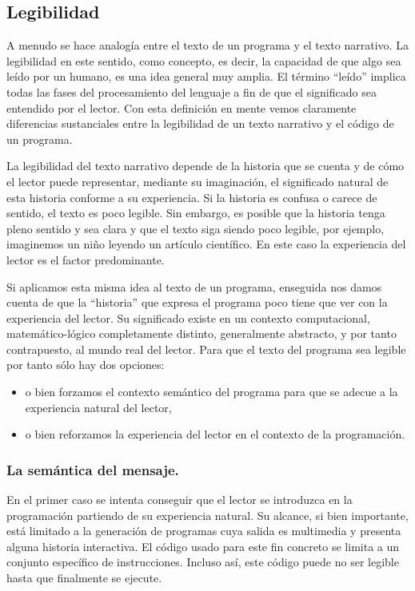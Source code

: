 \documentclass{llncs}
\begin{document}
\subsection{Legibilidad}
\label{subsec:readability}
A menudo se hace analogía entre el texto de un programa y el texto narrativo. La legibilidad en este sentido, como concepto, es decir, la capacidad de que algo sea leído por un humano, es una idea general muy amplia. El término ``leído'' implica todas las fases del procesamiento del lenguaje a fin de que el significado sea entendido por el lector. Con esta definición en mente vemos claramente diferencias sustanciales entre la legibilidad de un texto narrativo y el código de un programa. 

La legibilidad del texto narrativo depende de la historia que se cuenta y de cómo el lector puede representar, mediante su imaginación, el significado natural de esta historia conforme a su experiencia. Si la historia es confusa o carece de sentido, el texto es poco legible. Sin embargo, es posible que la historia tenga pleno sentido y sea clara y que el texto siga siendo poco legible, por ejemplo, imaginemos un niño leyendo un artículo científico. En este caso la experiencia del lector es el factor predominante. 

Si aplicamos esta misma idea al texto de un programa, enseguida nos damos cuenta de que la ``historia'' que expresa el programa poco tiene que ver con la experiencia del lector. Su significado existe en un contexto computacional, matemático-lógico completamente distinto, generalmente abstracto, y por tanto contrapuesto, al mundo real del lector. Para que el texto del programa sea legible por tanto sólo hay dos opciones: 

\begin{itemize}
\item o bien forzamos el contexto semántico del programa para que se adecue a la experiencia natural del lector, 
\item o bien reforzamos la experiencia del lector en el contexto de la programación. 
\end{itemize}

\subsubsection{La semántica del mensaje.}
\label{subsec:message}

En el primer caso se intenta conseguir que el lector se introduzca en la programación partiendo de su experiencia natural. Su alcance, si bien importante, está limitado a la generación de programas cuya salida es multimedia y presenta alguna historia interactiva. El código usado para este fin concreto se limita a un conjunto específico de instrucciones. Incluso así, este código puede no ser legible hasta que finalmente se ejecute. 
\end{document}
